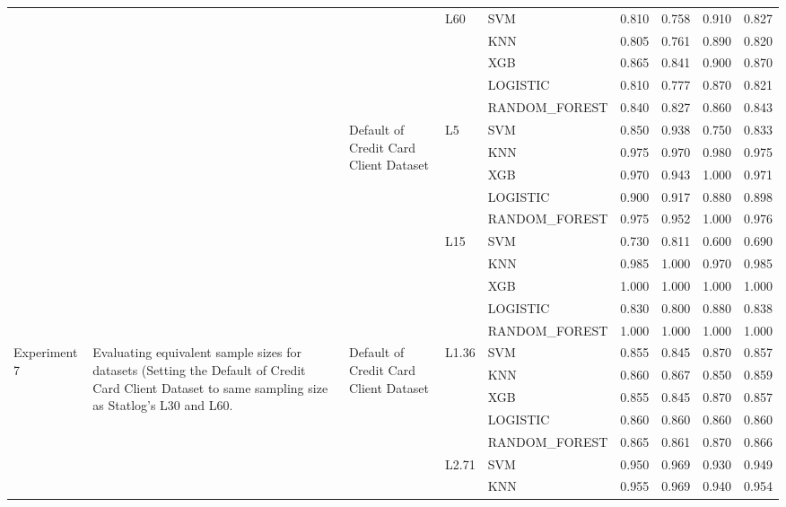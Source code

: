 \begin{table}
\begin{tabular}{lllllrrrr}
\cline{4-9}
 &  &  & \multirow[t]{5}{*}{L60} & SVM & 0.810 & 0.758 & 0.910 & 0.827 \\
 &  &  &  & KNN & 0.805 & 0.761 & 0.890 & 0.820 \\
 &  &  &  & XGB & 0.865 & 0.841 & 0.900 & 0.870 \\
 &  &  &  & LOGISTIC & 0.810 & 0.777 & 0.870 & 0.821 \\
 &  &  &  & RANDOM\_FOREST & 0.840 & 0.827 & 0.860 & 0.843 \\
\cline{3-9} \cline{4-9}
 &  & \multirow[t]{10}{*}{Default of Credit Card Client Dataset} & \multirow[t]{5}{*}{L5} & SVM & 0.850 & 0.938 & 0.750 & 0.833 \\
 &  &  &  & KNN & 0.975 & 0.970 & 0.980 & 0.975 \\
 &  &  &  & XGB & 0.970 & 0.943 & 1.000 & 0.971 \\
 &  &  &  & LOGISTIC & 0.900 & 0.917 & 0.880 & 0.898 \\
 &  &  &  & RANDOM\_FOREST & 0.975 & 0.952 & 1.000 & 0.976 \\
\cline{4-9}
 &  &  & \multirow[t]{5}{*}{L15} & SVM & 0.730 & 0.811 & 0.600 & 0.690 \\
 &  &  &  & KNN & 0.985 & 1.000 & 0.970 & 0.985 \\
 &  &  &  & XGB & 1.000 & 1.000 & 1.000 & 1.000 \\
 &  &  &  & LOGISTIC & 0.830 & 0.800 & 0.880 & 0.838 \\
 &  &  &  & RANDOM\_FOREST & 1.000 & 1.000 & 1.000 & 1.000 \\
\cline{1-9} \cline{2-9} \cline{3-9} \cline{4-9}
\multirow[t]{10}{*}{Experiment 7} & \multirow[t]{10}{*}{Evaluating equivalent sample sizes for datasets (Setting the Default of Credit Card Client Dataset to same sampling size as Statlog's L30 and L60.} & \multirow[t]{10}{*}{Default of Credit Card Client Dataset} & \multirow[t]{5}{*}{L1.36} & SVM & 0.855 & 0.845 & 0.870 & 0.857 \\
 &  &  &  & KNN & 0.860 & 0.867 & 0.850 & 0.859 \\
 &  &  &  & XGB & 0.855 & 0.845 & 0.870 & 0.857 \\
 &  &  &  & LOGISTIC & 0.860 & 0.860 & 0.860 & 0.860 \\
 &  &  &  & RANDOM\_FOREST & 0.865 & 0.861 & 0.870 & 0.866 \\
\cline{4-9}
 &  &  & \multirow[t]{5}{*}{L2.71} & SVM & 0.950 & 0.969 & 0.930 & 0.949 \\
 &  &  &  & KNN & 0.955 & 0.969 & 0.940 & 0.954 \\

\end{tabular}
\end{table}
